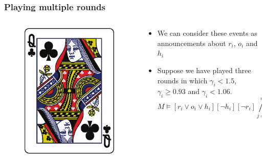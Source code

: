\documentclass[10pt]{beamer}
\begin{document}
\begin{frame}
\frametitle{Playing multiple rounds}
 \begin{columns}
  \begin{column}{3cm}
   \begin{figure}
    \includegraphics[width=\linewidth]{im/clubs_Q.eps}
   \end{figure}
  \end{column}
  
  \begin{column}{7cm}
    \begin{itemize}[label=$\clubsuit$]
     \item We can consider these events as announcements about $r_i$, $o_i$ and $h_i$
     \item Suppose we have played three rounds in which $\gamma_i < 1.5$, $\gamma_i \geq 0.93$ and $\gamma_i < 1.06$.
     \begin{equation*}
      M\models [r_i \vee o_i \vee h_i][\neg h_i][\neg r_i] \bigwedge_{j=1}^m K_j o_i
    \end{equation*}
    \end{itemize}
  \end{column}
 \end{columns}
\end{frame}


\end{document}
